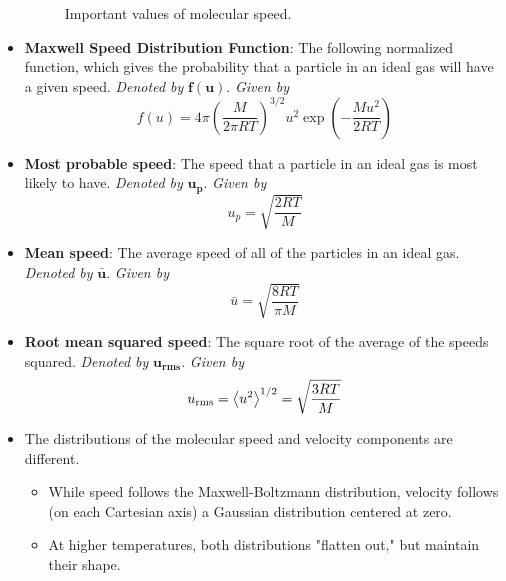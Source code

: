 \documentclass[../notes.tex]{subfiles}
\begin{document}
\begin{itemize}
\begin{figure}[H]
        \caption{Important values of molecular speed.}
        \label{fig:molecularSpeed}
    \end{figure}
    \item \textbf{Maxwell Speed Distribution Function}: The following normalized function, which gives the probability that a particle in an ideal gas will have a given speed. \emph{Denoted by} $\bm{f(u)}$. \emph{Given by}
    \begin{equation*}
        f(u) = 4\pi\left( \frac{M}{2\pi RT} \right)^{3/2}u^2\exp\left( -\frac{Mu^2}{2RT} \right)
    \end{equation*}
    \item \textbf{Most probable speed}: The speed that a particle in an ideal gas is most likely to have. \emph{Denoted by} $\bm{u_p}$. \emph{Given by}
    \begin{equation*}
        u_p = \sqrt{\frac{2RT}{M}}
    \end{equation*}
    \item \textbf{Mean speed}: The average speed of all of the particles in an ideal gas. \emph{Denoted by} $\bm{\bar{u}}$. \emph{Given by}
    \begin{equation*}
        \bar{u} = \sqrt{\frac{8RT}{\pi M}}
    \end{equation*}
    \item \textbf{Root mean squared speed}: The square root of the average of the speeds squared. \emph{Denoted by} $\bm{u_\text{rms}}$. \emph{Given by}
    \begin{equation*}
        u_\text{rms} = \left\langle{u^2}\right\rangle^{1/2}
        = \sqrt{\frac{3RT}{M}}
    \end{equation*}
    \item The distributions of the molecular speed and velocity components are different.
    \begin{itemize}
        \item While speed follows the Maxwell-Boltzmann distribution, velocity follows (on each Cartesian axis) a Gaussian distribution centered at zero.
        \item At higher temperatures, both distributions "flatten out," but maintain their shape.
    \end{itemize}

\end{itemize}
\end{document}
